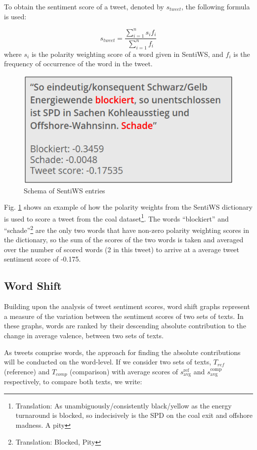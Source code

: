 \documentclass[12pt,onecolumn,twoside]{layout}
\begin{document}
To obtain the sentiment score of a tweet, denoted by \(s_{tweet}\), the following formula is used: 

\begin{equation}
\label{eq:word_score}
s_{tweet} = \frac{\sum_{i=1}^{n} s_i f_i}{\sum_{i=1}^{n} f_i}
\end{equation} 
where \(s_i\) is the polarity weighting score of a word given in SentiWS, and \(f_i\) is the frequency of occurrence of the word in the tweet. 

\begin{figure} 
	\begin{center}
		\includegraphics[width=0.5\linewidth]{figures/sentiws_example_use}
	\end{center}
	\caption{Schema of SentiWS entries}
	\label{fig:sentiws_example_use}
\end{figure}

Fig. \ref{fig:sentiws_example_use} shows an example of how the polarity weights from the SentiWS dictionary is used to score a tweet from the coal dataset\footnote{Translation: As unambiguously/consistently black/yellow as the energy turnaround is blocked, so indecisively is the SPD on the coal exit and offshore madness. A pity}. The words ``blockiert'' and ``schade''\footnote{Translation: Blocked, Pity} are the only two words that have non-zero polarity weighting scores in the dictionary, so the sum of the scores of the two words is taken and averaged over the number of scored words (2 in this tweet) to arrive at a average tweet sentiment score of -0.175. 

\subsection*{Word Shift}
Building upon the analysis of tweet sentiment scores, word shift graphs represent a measure of the variation between the sentiment scores of two sets of texts. In these graphs, words are ranked by their descending absolute contribution to the change in average valence, between two sets of texts. 

As tweets comprise words, the approach for finding the absolute contributions will be conducted on the word-level. If we consider two sets of texts, \(T_{ref}\) (reference) and \(T_{comp}\) (comparison) with average scores of \(s_{\text{avg}}^{\text{ref}}\) and \(s_{\text{avg}}^{\text{comp}}\) respectively, to compare both texts, we write: 
\end{document}
